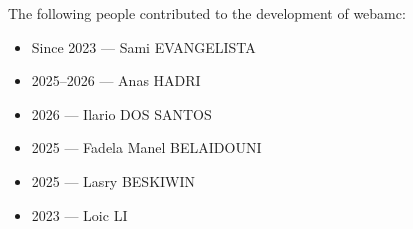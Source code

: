 The following people contributed to the development of webamc:

\begin{itemize}
\item[] Since 2023 --- Sami EVANGELISTA
\item[] 2025--2026 --- Anas HADRI
\item[] 2026 --- Ilario DOS SANTOS
\item[] 2025 --- Fadela Manel BELAIDOUNI
\item[] 2025 --- Lasry BESKIWIN
\item[] 2023 --- Loic LI
\end{itemize}
